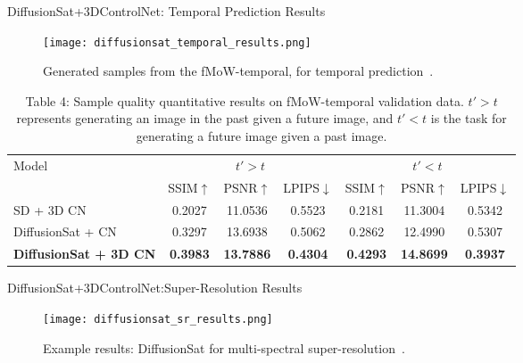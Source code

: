   \begin{refsection}
  \begin{frame}{DiffusionSat+3DControlNet: Temporal Prediction Results}
    \begin{figure}
      \centering
      \texttt{[image: diffusionsat\_temporal\_results.png]}
      \caption[]{\scriptsize Generated samples from the fMoW-temporal, for temporal prediction~\parencite{diffusionset2024}.}
    \end{figure}
    \begin{table}[h]
      \centering
      \scriptsize
      \begin{tabular}{l|ccc|ccc}
        \toprule
        \multirow{2}{*}{Model} & \multicolumn{3}{c|}{$t' > t$} & \multicolumn{3}{c}{$t' < t$} \\
        & SSIM$\uparrow$ & PSNR$\uparrow$ & LPIPS$\downarrow$ & SSIM$\uparrow$ & PSNR$\uparrow$ & LPIPS$\downarrow$ \\
        \midrule
        SD + 3D CN & 0.2027 & 11.0536 & 0.5523 & 0.2181 & 11.3004 & 0.5342 \\
        DiffusionSat + CN & 0.3297 & 13.6938 & 0.5062 & 0.2862 & 12.4990 & 0.5307 \\
        \textbf{DiffusionSat + 3D CN} & \textbf{0.3983} & \textbf{13.7886} & \textbf{0.4304} & \textbf{0.4293} & \textbf{14.8699} & \textbf{0.3937} \\
        \bottomrule
      \end{tabular}
      \caption[]{\scriptsize Table 4: Sample quality quantitative results on fMoW-temporal validation data. $t' > t$ represents generating an image in the past given a future image, and $t' < t$ is the task for generating a future image given a past image.}
    \end{table}
    \bottomleftrefs
  \end{frame}
  \end{refsection}

    
  \begin{refsection}
  \begin{frame}{DiffusionSat+3DControlNet:Super-Resolution Results}
    \begin{figure}
      \centering
      \texttt{[image: diffusionsat\_sr\_results.png]}
      \caption[]{\scriptsize Example results: DiffusionSat for multi-spectral super-resolution~\parencite{diffusionset2024}.}
    \end{figure}
    \bottomleftrefs
  \end{frame}
  \end{refsection}



